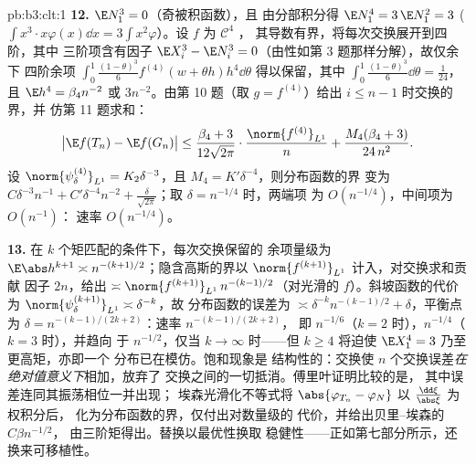 \begin{solution}{pb:b3:clt:1}
\textbf{12.} $\E N_1^3 = 0$（奇被积函数），且
由分部积分得 $\E N_1^4 = 3\,\E N_1^2 = 3$
($\int x^3\cdot x\varphi(x)\dd x =
3\int x^2\varphi$）。设 $f$ 为 $\mathcal C^4$ ，
其导数有界，将每次交换展开到四阶，其中
三阶项含有因子 $\E X_i^3 - \E N_i^3 =
0$（由性如第 3 题那样分解），故仅余下
四阶余项
$\int_0^1\frac{(1-\theta)^3}6f^{(4)}(w + \theta
h)h^4\dd\theta$ 得以保留，其中 $\int_0^1
\frac{(1-\theta)^3}6\dd\theta = \frac1{24}$，且 $\E h^4 =
\beta_4n^{-2}$ 或 $3n^{-2}$。由第 10 题（取 $g =
f^{(4)}$）给出 $i \leq n - 1$ 时交换的界，并
仿第 11 题求和：
\[
\bigl|\E f(T_n) - \E f(G_n)\bigr| \leq
\frac{\beta_4 + 3}{12\sqrt{2\pi}}\cdot
\frac{\norm{f^{(4)}}_{L^1}}{n} +
\frac{M_4(\beta_4 + 3)}{24\,n^2} .
\]
设 $\norm{\psi_\delta^{(4)}}_{L^1} = K_2\delta^{-3}$，且
$M_4 = K'\delta^{-4}$，则分布函数的界
变为 $C\delta^{-3}n^{-1} + C'\delta^{-4}n^{-2} +
\frac\delta{\sqrt{2\pi}}$；取 $\delta = n^{-1/4}$ 时，两端项
为 $O(n^{-1/4})$，中间项为 $O(n^{-1})$：
速率 $O(n^{-1/4})$。

\textbf{13.} 在 $k$ 个矩匹配的条件下，每次交换保留的
余项量级为 $\E\abs h^{k+1} \asymp
n^{-(k+1)/2}$；隐含高斯的界以
$\norm{f^{(k+1)}}_{L^1}$ 计入，对交换求和贡献
因子 $2n$，给出 $\asymp\norm{f^{(k+1)}}_{L^1}\,
n^{-(k-1)/2}$（对光滑的 $f$）。斜坡函数的代价为
$\norm{\psi_\delta^{(k+1)}}_{L^1} \asymp \delta^{-k}$，故
分布函数的误差为 $\asymp
\delta^{-k}n^{-(k-1)/2} + \delta$，平衡点为 $\delta =
n^{-(k-1)/(2k+2)}$：速率 $n^{-(k-1)/(2k+2)}$，
即 $n^{-1/6}$（$k = 2$ 时），$n^{-1/4}$（$k = 3$ 时），并趋向
于 $n^{-1/2}$，仅当 $k \to \infty$ 时——但 $k \geq 4$
将迫使 $\E X_1^4 = 3$ 乃至更高矩，亦即一个
分布已在模仿。饱和现象是
结构性的：交换使 $n$ 个交换误差\emph{在
绝对值意义下}相加，放弃了
交换之间的一切抵消。傅里叶证明比较的是，
其中误差连同其振荡相位一并出现；
埃森光滑化不等式将 $\abs{\varphi_{T_n}
- \varphi_N}$ 以 $\frac{\dd\xi}{\abs\xi}$ 为权积分后，
化为分布函数的界，仅付出对数量级的
代价，并给出贝里--埃森的 $C\beta n^{-1/2}$，
由三阶矩得出。替换以最优性换取
稳健性——正如第七部分所示，还换来可移植性。


\end{solution}
